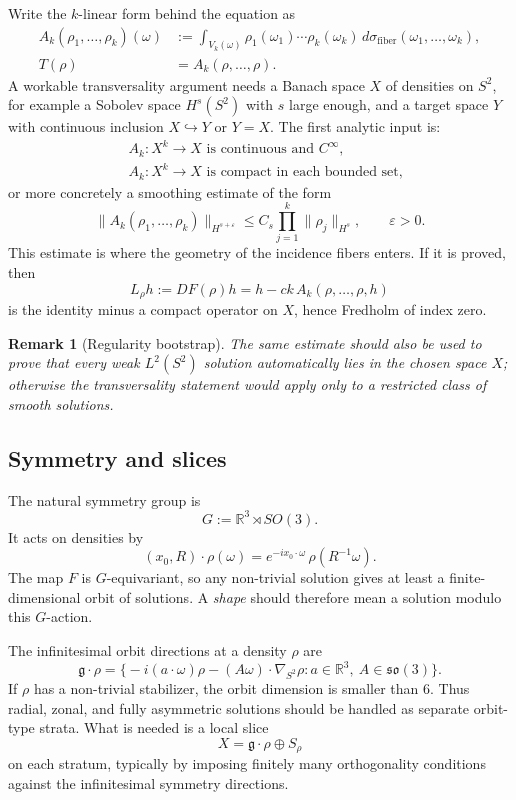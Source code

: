 \documentclass[12pt]{article}
\newtheorem{remark}[theorem]{Remark}
\begin{document}
Write the $k$-linear form behind the equation as
\[
  \begin{aligned}
  A_k(\rho_1,\ldots,\rho_k)(\omega)
  &:=
  \int_{V_k(\omega)}\rho_1(\omega_1)\cdots\rho_k(\omega_k)\,
       d\sigma_{\mathrm{fiber}}(\omega_1,\ldots,\omega_k),\\
  T(\rho)&=A_k(\rho,\ldots,\rho).
  \end{aligned}
\]
A workable transversality argument needs a Banach space $X$ of densities on
$S^2$, for example a Sobolev space $H^s(S^2)$ with $s$ large enough, and a
target space $Y$ with continuous inclusion $X\hookrightarrow Y$ or $Y=X$.
The first analytic input is:
\[
  \begin{aligned}
  &A_k:X^k\to X \text{ is continuous and } C^\infty,\\
  &A_k:X^k\to X \text{ is compact in each bounded set,}
  \end{aligned}
\]
or more concretely a smoothing estimate of the form
\[
  \|A_k(\rho_1,\ldots,\rho_k)\|_{H^{s+\varepsilon}}
  \leq C_s\prod_{j=1}^k\|\rho_j\|_{H^s},
  \qquad \varepsilon>0.
\]
This estimate is where the geometry of the incidence fibers enters. If it is
proved, then
\[
  L_\rho h := DF(\rho)h
     = h - ck\,A_k(\rho,\ldots,\rho,h)
\]
is the identity minus a compact operator on $X$, hence Fredholm of index zero.

\begin{remark}[Regularity bootstrap]
  The same estimate should also be used to prove that every weak
  $L^2(S^2)$ solution automatically lies in the chosen space $X$; otherwise the
  transversality statement would apply only to a restricted class of smooth
  solutions.
\end{remark}

\subsection{Symmetry and slices}

The natural symmetry group is
\[
  G := \mathbb{R}^3 \rtimes SO(3).
\]
It acts on densities by
\[
  (x_0,R)\cdot\rho(\omega)
    = e^{-ix_0\cdot\omega}\,\rho(R^{-1}\omega).
\]
The map $F$ is $G$-equivariant, so any non-trivial solution gives at least a
finite-dimensional orbit of solutions. A \emph{shape} should therefore mean a
solution modulo this $G$-action.

The infinitesimal orbit directions at a density $\rho$ are
\[
  \mathfrak g\cdot\rho
  =
  \bigl\{
    -i(a\cdot\omega)\rho - (A\omega)\cdot\nabla_{S^2}\rho
    : a\in\mathbb{R}^3,\ A\in\mathfrak{so}(3)
  \bigr\}.
\]
If $\rho$ has a non-trivial stabilizer, the orbit dimension is smaller than
$6$. Thus radial, zonal, and fully asymmetric solutions should be handled as
separate orbit-type strata. What is needed is a local slice
\[
  X = \mathfrak g\cdot\rho \oplus S_\rho
\]
on each stratum, typically by imposing finitely many orthogonality conditions
against the infinitesimal symmetry directions.
\end{document}
